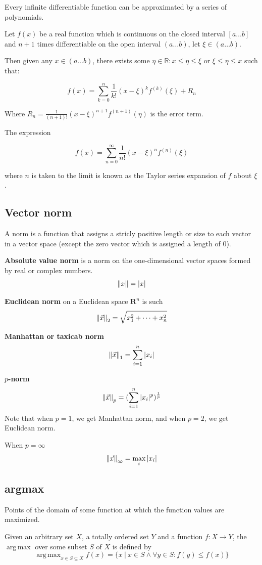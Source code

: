 \documentclass{article}
\DeclareMathOperator*{\argmax}{arg\,max}
\DeclareMathOperator*{\mmax}{max}
\begin{document}
Every infinite differentiable function can be approximated by a series of polynomials.

Let $f(x)$ be a real function which is continuous on the closed interval $[a \dots b]$ and $n + 1$ times differentiable on the open interval $(a \dots b)$, let $\xi \in (a \dots b)$.

Then given any $x \in (a \dots b)$, there exists some $\eta \in \mathbb{R} : x \leq \eta \leq \xi$ or $\xi \leq \eta \leq x$ such that:

$$
f(x) = \sum_{k = 0}^{n} \frac{1}{k!} (x - \xi)^k f^{(k)}(\xi) + R_n
$$

Where $R_n = \frac{1}{(n + 1)!} (x - \xi)^{n + 1} f^{(n + 1)}(\eta)$ is the error term.

The expression

$$
f(x) = \sum_{n = 0}^{\infty} \frac{1}{n!} (x - \xi)^n f^{(n)}(\xi)
$$

where $n$ is taken to the limit is known as the Taylor series expansion of $f$ about $\xi$.

\subsection{Vector norm}
A norm is a function that assigns a stricly positive length or size to each vector in a vector space (except the zero vector which is assigned a length of 0).

\textbf{Absolute value norm} is a norm on the one-dimensional vector spaces formed by real or complex numbers.
$$
\norm{x} = |x|
$$

\textbf{Euclidean norm} on a Euclidean space $\mathbf{R}^n$ is such
$$
\norm{\vec{x}}_2 = \sqrt{x_1^2 + \dots + x_n^2}
$$

\textbf{Manhattan or taxicab norm}
$$
\norm{\vec{x}}_1 = \sum_{i = 1}^{n}{|x_i|}
$$

\textbf{$p$-norm}
$$
\norm{\vec{x}}_p = (\sum_{i = 1}^{n}{|x_i|^p})^{\frac{1}{p}}
$$
Note that when $p = 1$, we get Manhattan norm, and when $p = 2$, we get Euclidean norm.

When $p = \infty$
$$
\norm{\vec{x}}_{\infty} = {\mmax_{i}{|x_i|}}
$$

\subsection{argmax}

Points of the domain of some function at which the function values are maximized.

Given an arbitrary set $X$, a totally ordered set $Y$ and a function $f: X \to Y$, the $\argmax$ over some subset $S$ of $X$ is defined by
$$
\argmax_{x \in S \subseteq X}{f(x)} = \{x ~ | ~ x \in S \land \forall y \in S : f(y) \leq f(x)\}
$$
\end{document}
